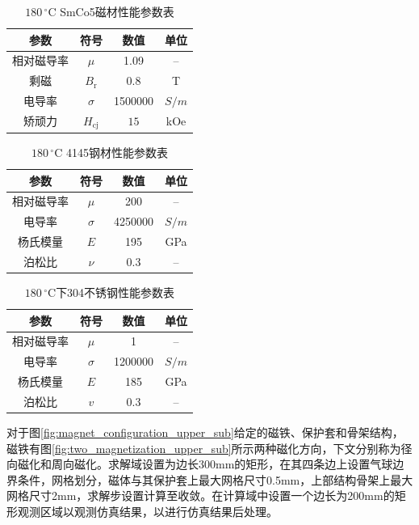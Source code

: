\begin{table}[htbp]
    \centering
    \caption{$180\,^\circ\mathrm{C}$ SmCo5磁材性能参数表}
    \label{tab:smco5_params}
    \begin{tabularx}{.9\textwidth}{CCCC}
        \toprule
        参数 & 符号 & 数值 & 单位 \\
        \midrule
        相对磁导率 & $\mu$ & 1.09 & -- \\
        剩磁 & $B_\mathrm{r}$ & 0.8 & T \\
        电导率 & $\sigma$ & 1500000 & $S/m$ \\
        矫顽力 & $H_{\mathrm{cj}}$ & $15$ & kOe \\
        \bottomrule
    \end{tabularx}
\end{table}

\begin{table}[htbp]
    \centering
    \caption{$180\,^\circ\mathrm{C}$ 4145钢材性能参数表}
    \label{tab:steel_params}
    \begin{tabularx}{.9\textwidth}{CCCC}
        \toprule
        参数 & 符号 & 数值 & 单位 \\
        \midrule
        相对磁导率 & $\mu$ & 200 & -- \\
        电导率 & $\sigma$ & 4250000 & $S/m$ \\
        杨氏模量 & $E$ & 195 & GPa \\
        泊松比 & $\nu$ & 0.3 & -- \\
        \bottomrule
    \end{tabularx}
\end{table}

\begin{table}[htbp]
  \centering
  \caption{$180\,^\circ \mathrm{C}$下304不锈钢性能参数表}
  \label{tab:304_properties_180c}
  \begin{tabularx}{.9\textwidth}{CCCC}
    \toprule
    参数 & 符号 & 数值 & 单位 \\
    \midrule
    相对磁导率 & $\mu$ & 1 & -- \\
    电导率 & $\sigma$ & 1200000 & $S/m$ \\
    杨氏模量 & $E$ & 185 & GPa \\
    泊松比 & $v$ & 0.3 & -- \\
    \bottomrule
  \end{tabularx}
\end{table}


对于图\ref{fig:magnet_configuration_upper_sub}给定的磁铁、保护套和骨架结构，磁铁有图\ref{fig:two_magnetization_upper_sub}所示两种磁化方向，下文分别称为径向磁化和周向磁化。求解域设置为边长300mm的矩形，在其四条边上设置气球边界条件，网格划分，磁体与其保护套上最大网格尺寸0.5mm，上部结构骨架上最大网格尺寸2mm，求解步设置计算至收敛。在计算域中设置一个边长为200mm的矩形观测区域以观测仿真结果，以进行仿真结果后处理。

